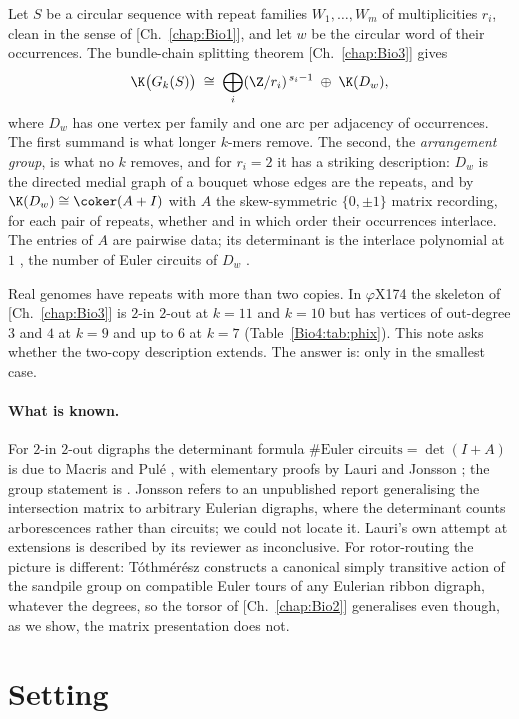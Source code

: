 Let $S$ be a circular sequence with repeat families $W_1,\dots,W_m$ of multiplicities
$r_i$, clean in the sense of [Ch.~\ref{chap:Bio1}], and let $w$ be the circular word of their
occurrences. The bundle-chain splitting theorem [Ch.~\ref{chap:Bio3}] gives
\[
\K\bigl(G_k(S)\bigr)\;\cong\;\bigoplus_i(\Z/r_i)^{\,s_i-1}\;\oplus\;\K(D_w),
\]
where $D_w$ has one vertex per family and one arc per adjacency of occurrences. The
first summand is what longer $k$-mers remove. The second, the \emph{arrangement group},
is what no $k$ removes, and for $r_i=2$ it has a striking description: $D_w$ is the
directed medial graph of a bouquet whose edges are the repeats, and by
\cite[Thm.~7.3]{MMN} $\K(D_w)\cong\coker(A+I)$ with $A$ the skew-symmetric
$\{0,\pm1\}$ matrix recording, for each pair of repeats, whether and in which order
their occurrences interlace. The entries of $A$ are pairwise data; its determinant is the
interlace polynomial at $1$ \cite{ABS}, the number of Euler circuits of $D_w$
\cite{MacrisPule,Jonsson}.

Real genomes have repeats with more than two copies. In $\varphi$X174 the skeleton of
[Ch.~\ref{chap:Bio3}] is $2$-in $2$-out at $k=11$ and $k=10$ but has vertices of out-degree $3$ and
$4$ at $k=9$ and up to $6$ at $k=7$ (Table~\ref{Bio4:tab:phix}). This note asks whether the
two-copy description extends. The answer is: only in the smallest case.

\paragraph{What is known.} For $2$-in $2$-out digraphs the determinant formula
$\#\text{Euler circuits}=\det(I+A)$ is due to Macris and Pul\'e \cite{MacrisPule}, with
elementary proofs by Lauri and Jonsson \cite{Jonsson}; the group statement is
\cite{MMN}. Jonsson \cite[p.~192]{Jonsson} refers to an unpublished report generalising
the intersection matrix to arbitrary Eulerian digraphs, where the determinant counts
arborescences rather than circuits; we could not locate it. Lauri's own attempt at
extensions \cite{Lauri} is described by its reviewer as inconclusive. For rotor-routing
the picture is different: T\'othm\'er\'esz \cite{Toth} constructs a canonical simply
transitive action of the sandpile group on compatible Euler tours of any Eulerian ribbon
digraph, whatever the degrees, so the torsor of [Ch.~\ref{chap:Bio2}] generalises even though, as
we show, the matrix presentation does not.

\section{Setting}\label{Bio4:sec:setting}

